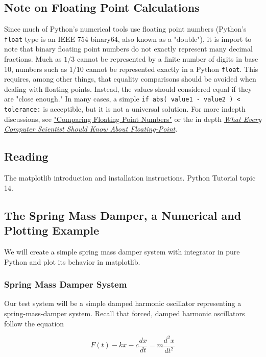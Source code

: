 \documentclass{report}
\begin{document}
\subsection*{Note on Floating Point Calculations}
Since much of Python's numerical tools use floating point numbers (Python's \verb|float| type is an IEEE 754 binary64, also known as a "double"), it is import to note that binary floating point numbers do not exactly represent many decimal fractions. Much as $1/3$ cannot be represented by a finite number of digits in base 10, numbers such as $1/10$ cannot be represented exactly in a Python \verb|float|. This requires, among other things, that equality comparisons should be avoided when dealing with floating points. Instead, the values should considered equal if they are "close enough." In many cases, a simple \verb|if abs( value1 - value2 ) < tolerance:| is acceptible, but it is not a universal solution. For more indepth discussions, see \href{http://www.cygnus-software.com/papers/comparingfloats/comparingfloats.htm}{"Comparing Floating Point Numbers"}  or the in depth \href{http://www.cse.msu.edu/~cse320/Documents/FloatingPoint.pdf}{\emph{What Every Computer Scientist Should Know About Floating-Point}}.

\subsection{Reading}
The matplotlib introduction and installation instructions. Python Tutorial topic 14.

\subsection{The Spring Mass Damper, a Numerical and Plotting Example}

We will create a simple spring mass damper system with integrator in pure Python and plot its behavior in matplotlib.

\subsubsection{Spring Mass Damper System}

Our test system will be a simple damped harmonic oscillator representing a spring-mass-damper system. Recall that forced, damped harmonic oscillators follow the equation\cite{website:wikipedia}

\begin{displaymath}
F(t)-kx-c\frac{dx}{dt}=m\frac{d^2x}{dt^2}
\end{displaymath}
\end{document}
